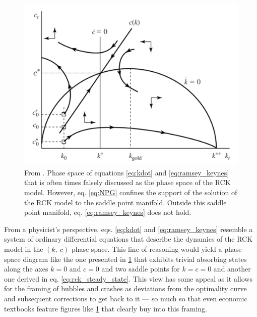 \begin{figure}[t]
  \begin{minipage}[c]{0.4\textwidth}

      \caption[Phase space diagram of the original Ramsey-Cass-Koopmans model]{From \cite[p. 100]{Barro2004}. Phase space of equations \eqref{eq:kdot} and \eqref{eq:ramsey_keynes} that is often times falsely discussed as the phase space of the RCK model. However, eq. \eqref{eq:NPG} confines the support of the solution of the RCK model to the saddle point manifold. Outside this saddle point manifold, eq. \eqref{eq:ramsey_keynes} does not hold.\label{fig:rck_phase_space}}
  \end{minipage}
  \begin{minipage}[c]{0.6\textwidth}
        \includegraphics[width = 1 \textwidth]{./figures/RCK_phase_space.png}
  \end{minipage}\hfill

\end{figure}
From a physicist's perspective, eqs. \eqref{eq:kdot} and \eqref{eq:ramsey_keynes} resemble a system of ordinary differential equations that describe the dynamics of the RCK model in the $(k,~c)$ phase space. This line of reasoning would yield a phase space diagram like the one presented in \cref{fig:rck_phase_space} that exhibits trivial absorbing states along the axes $k=0$ and $c=0$ and two saddle points for $k=c=0$ and another one derived in eq. \eqref{eq:rck_steady_state}.
This view has some appeal as it allows for the framing of bubbles and crashes as deviations from the optimality curve and subsequent corrections to get back to it --- so much so that even economic textbooks feature figures like \cref{fig:rck_phase_space} that clearly buy into this framing.
